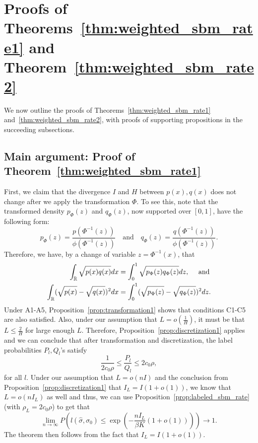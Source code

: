 \documentclass{article}
\begin{document}

\section{Proofs of Theorems~\ref{thm:weighted_sbm_rate1} and Theorem~\ref{thm:weighted_sbm_rate2}}
\label{sec:transformation_proof}

We now outline the proofs of Theorems~\ref{thm:weighted_sbm_rate1} and~\ref{thm:weighted_sbm_rate2}, with proofs of supporting propositions in the succeeding subsections.

\subsection{Main argument: Proof of Theorem~\ref{thm:weighted_sbm_rate1}}
\label{AppThmRate1}

First, we claim that the divergence $I$ and $H$ between $p(x), q(x)$ does not change after we apply the transformation $\Phi$. To see this, note that the transformed density $p_{\Phi}(z)$ and $q_{\Phi}(z)$, now supported over $[0,1]$, have the following form:
\[
p_{\Phi}(z) = \frac{p(\Phi^{-1}(z))}{\phi(\Phi^{-1}(z))} \quad \text{and} \quad
q_{\Phi}(z) = \frac{q(\Phi^{-1}(z))}{\phi(\Phi^{-1}(z))}.
\]
Therefore, we have, by a change of variable $z = \Phi^{-1}(x)$, that
\begin{align*}
\int_{\mathbb R} \sqrt{p(x) q(x)} dx &= \int_0^1 \sqrt{p_{\Phi}(z) q_{\Phi}(z)} dz, \quad \text{ and} \\
\int_{\mathbb R} (\sqrt{p(x)} - \sqrt{q(x)})^2 dx &= \int_0^1 (\sqrt{p_{\Phi}(z)} - \sqrt{ q_{\Phi}(z)})^2 dz. 
\end{align*}
Under A1-A5, Proposition~\ref{prop:transformation1} shows that conditions C1-C5 are also satisfied. Also, under our assumption that $L = o(\frac{1}{H})$, it must be that $L \leq \frac{2}{H}$ for large enough $L$. Therefore, Proposition~\ref{prop:discretization1} applies and we can conclude that after transformation and discretization, the label probabilities $P_l, Q_l$'s satisfy 
\[
\frac{1}{2c_0 \rho} \leq \frac{P_l}{Q_l} \leq 2c_0 \rho,
\]
for all $l$.  Under our assumption that $L = o(nI)$ and the conclusion from Proposition~\ref{prop:discretization1} that $I_L = I (1 + o(1))$, we know that $L = o(n I_L)$ as well and thus, we can use Proposition~\ref{prop:labeled_sbm_rate} (with $\rho_L = 2 c_0 \rho$) to get that
\[
\lim_{n \rightarrow \infty} P \left( l(\hat{\sigma}, \sigma_0) \leq \exp \left( - \frac{ n I_L}{ \beta K} (1 + o(1)) \right) \right) \rightarrow 1.
\]
The theorem then follows from the fact that $I_L = I(1+o(1))$. 
\end{document}

